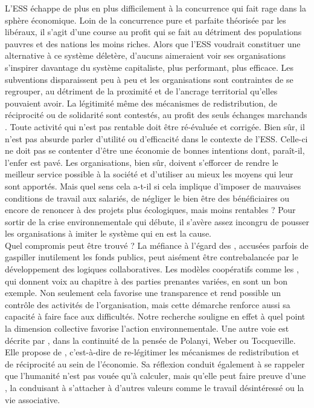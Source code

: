 L'ESS échappe de plus en plus difficilement à la concurrence qui fait rage dans la sphère économique. Loin de la concurrence pure et parfaite théorisée par les libéraux, il s'agit d'une course au profit qui se fait au détriment des populations pauvres et des nations les moins riches. Alors que l'ESS voudrait constituer une alternative à ce système déletère, d'aucuns aimeraient voir ses organisations s'inspirer davantage du système capitaliste, plus performant, plus efficace. Les subventions disparaissent peu à peu et les organisations sont contraintes de se regrouper, au détriment de la proximité et de l'ancrage territorial qu'elles pouvaient avoir. La légitimité même des mécanismes de redistribution, de réciprocité ou de solidarité sont contestés, au profit des seuls échanges marchands \parencite{eynaud2019mobiliser}. Toute activité qui n'est pas rentable doit être ré-évaluée et corrigée. Bien sûr, il n'est pas absurde parler d'utilité ou d'efficacité dans le contexte de l'ESS. Celle-ci ne doit pas se contenter d'être une économie de bonnes intentions dont, paraît-il, l'enfer est pavé. Les organisations, bien sûr, doivent s'efforcer de rendre le meilleur service possible à la société et d'utiliser au mieux les moyens qui leur sont apportés. Mais quel sens cela a-t-il si cela implique d'imposer de mauvaises conditions de travail aux salariés, de négliger le bien être des bénéficiaires ou encore de renoncer à des projets plus écologiques, mais moins rentables ? Pour sortir de la crise environnementale qui débute, il s'avère assez incongru de pousser les organisations à imiter le système qui en est la cause. \\

Quel compromis peut être trouvé ? La méfiance à l'égard des \oess, accusées parfois de gaspiller inutilement les fonds publics, peut aisément être contrebalancée par le développement des logiques collaboratives. Les modèles coopératifs comme les \scic, qui donnent voix au chapitre à des parties prenantes variées, en sont un bon exemple. Non seulement cela favorise une transparence et rend possible un contrôle des activités de l'organisation, mais cette démarche renforce aussi sa capacité à faire face aux difficultés. Notre recherche souligne en effet à quel point la dimension collective favorise l'action environnementale. Une autre voie est décrite par \textcite{eynaud2019mobiliser}, dans la continuité de la pensée de Polanyi, Weber ou Tocqueville. Elle propose de , c'est-à-dire de re-légitimer les mécanismes de redistribution et de réciprocité au sein de l'économie. Sa réflexion conduit également à se rappeler que l'humanité n'est pas vouée qu'à calculer, mais qu'elle peut faire preuve d'une , la conduisant à s'attacher à d'autres valeurs comme le travail désintéressé ou la vie associative.



